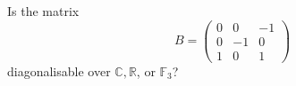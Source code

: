 \documentclass[answers]{exam}
\begin{document}
\begin{questions}



\question%
Is the matrix \[
	B=\begin{pmatrix}
		0 & 0 & -1 \\
		0 & -1 & 0 \\
		1 & 0 & 1
	\end{pmatrix}
\] diagonalisable over $\mathbb{C}, \mathbb{R}$, or $\mathbb{F}_{3}$?

\end{questions}
\end{document}
